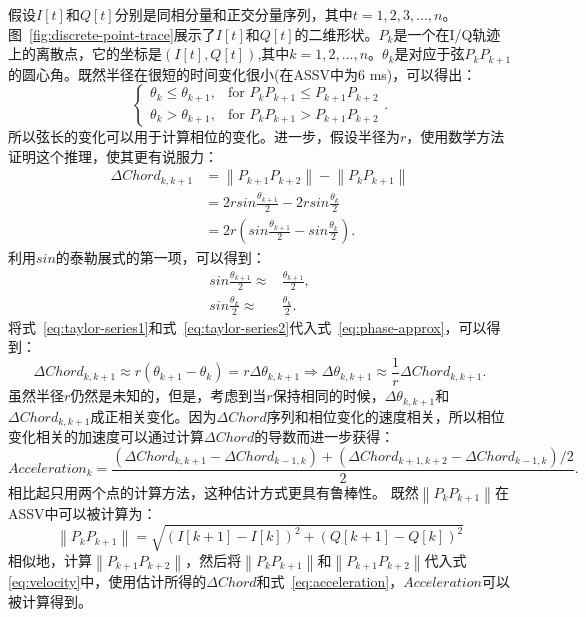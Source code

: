 假设$I[t]$和$Q[t]$分别是同相分量和正交分量序列，其中$t=1,2,3,...,n$。图~\ref{fig:discrete-point-trace}展示了$I[t]$和$Q[t]$的二维形状。$P_k$是一个在I/Q轨迹上的离散点，它的坐标是$(I[t],Q[t])$,其中$k=1,2,...,n$。$\theta_{k}$是对应于弦$P_{k}P_{k+1}$的圆心角。既然半径在很短的时间变化很小(在ASSV中为6 ms)，可以得出：
$$
\begin{cases} 
  \theta_{k} \leq \theta_{k+1}, & \text{for } P_{k}P_{k+1} \leq P_{k+1}P_{k+2}  \\
  \theta_{k} > \theta_{k+1},  & \text{for } P_{k}P_{k+1} > P_{k+1}P_{k+2}
\end{cases}
.
$$
所以弦长的变化可以用于计算相位的变化。进一步，假设半径为$r$，使用数学方法证明这个推理，使其更有说服力：
\begin{align}
\Delta Chord_{k,k+1} &= \left\|P_{k+1}P_{k+2}\right\| - \left\|P_{k}P_{k+1}\right\|  \\ \label{eq:phase-approx}
&= 2rsin\frac{\theta_{k+1}}{2} - 2rsin\frac{\theta_{k}}{2} \nonumber \\  
&= 2r\left(sin\frac{\theta_{k+1}}{2} - sin\frac{\theta_{k}}{2}\right)  
.
\end{align}
利用$sin$的泰勒展式的第一项，可以得到：
\begin{align}
   sin\frac{\theta_{k+1}}{2} \approx & \frac{\theta_{k+1}}{2} ,\label{eq:taylor-series1}\\ 
    sin\frac{\theta_{k}}{2} \approx & \frac{\theta_{k}}{2}. \label{eq:taylor-series2}
\end{align}
将式~\eqref{eq:taylor-series1}和式~\eqref{eq:taylor-series2}代入式~\eqref{eq:phase-approx}，可以得到：
\begin{equation}
 \Delta Chord_{k,k+1} \approx r(\theta_{k+1} - \theta_{k})=r\Delta \theta_{k,k+1} \Rightarrow \Delta \theta_{k,k+1} \approx \frac{1}{r}\Delta Chord_{k,k+1}.  \label{eq:velocity}
\end{equation}
虽然半径$r$仍然是未知的，但是，考虑到当$r$保持相同的时候，$\Delta \theta_{k,k+1}$和$\Delta Chord_{k,k+1}$成正相关变化。因为$\Delta Chord$序列和相位变化的速度相关，所以相位变化相关的加速度可以通过计算$\Delta Chord$的导数而进一步获得：
\begin{equation}
Acceleration_{k} = \frac{\left( \Delta Chord_{k,k+1} - \Delta Chord_{k-1,k} \right) + \left( \Delta Chord_{k+1,k+2}- \Delta Chord_{k-1,k}\right)/2}{2}. \label{eq:acceleration}
\end{equation}
相比起只用两个点的计算方法，这种估计方式更具有鲁棒性。
既然$\left\|P_{k}P_{k+1}\right\|$在ASSV中可以被计算为：
\begin{equation}
  \left\|P_{k}P_{k+1}\right\|= \sqrt{\left( I[k+1] - I[k] \right)^2 + \left( Q[k+1] - Q[k] \right)^2}
\end{equation}
相似地，计算$\left\|P_{k+1}P_{k+2}\right\|$，然后将$\left\|P_{k}P_{k+1}\right\|$和$\left\|P_{k+1}P_{k+2}\right\|$代入式\eqref{eq:velocity}中，使用估计所得的$\Delta Chord $和式~\eqref{eq:acceleration}，$Acceleration$可以被计算得到。



